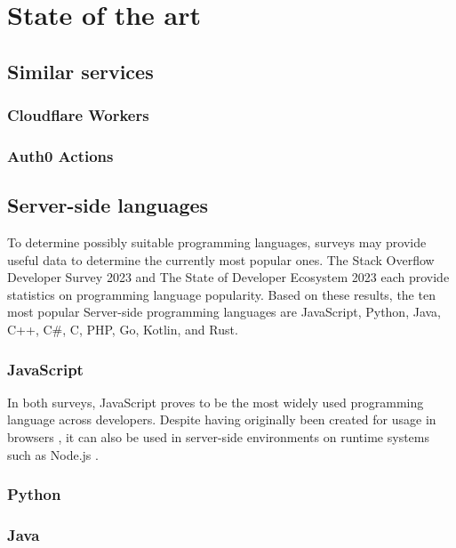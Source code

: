 \section{State of the art}%
\label{sec:state-of-the-art}

\subsection{Similar services}

\subsubsection{Cloudflare Workers}

\subsubsection{Auth0 Actions}

\subsection{Server-side languages}

To determine possibly suitable programming languages, surveys may provide useful data to determine the currently most popular ones. The Stack Overflow Developer Survey 2023 \autocite{StackOverflow2023} and The State of Developer Ecosystem 2023 \autocite{JetBrains2023} each provide statistics on programming language popularity. Based on these results, the ten most popular Server-side programming languages are JavaScript, Python, Java, C++, C\#, C, PHP, Go, Kotlin, and Rust.

\subsubsection{JavaScript}
In both surveys, JavaScript proves to be the most widely used programming language across developers. Despite having originally been created for usage in browsers \autocite{NCC1995}, it can also be used in server-side environments on runtime systems such as Node.js \autocite{OpenJSFoundation}.

\subsubsection{Python}

\subsubsection{Java}

